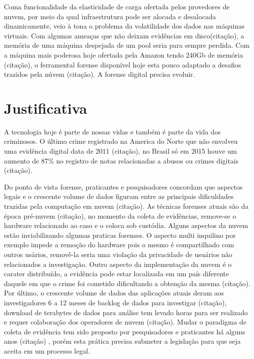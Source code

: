\documentclass[
	12pt,				%
	openright,			%
	oneside,			%
	a4paper,			%
	english,			%
	french,				%
	spanish,			%
	brazil,				%
	]{abntex2}
\begin{document}
\par

Coma funcionalidade da elasticidade de carga ofertada pelos provedores de nuvem, por meio da qual infraestrutura pode ser alocada e desalocada dinamicamente, veio à tona o problema
da volatilidade dos dados nas máquinas virtuais. Com algumas ameaças que não deixam evidências em disco(citação), a memória de uma máquina despejada de um pool seria para sempre
perdida. Com a máquina mais poderosa hoje ofertada pela Amazon tendo 240Gb de memória (citação), o ferramental forense disponível hoje esta pouco adaptado a desafios trazidos 
pela núvem (citação). A forense digital precisa evoluir.

\chapter{Justificativa}

A tecnologia hoje é parte de nossas vidas e também é parte da vida dos criminosos. O último crime registrado na America do Norte que não envolveu uma evidência digital data de 2011
(citação), no Brasil só em 2015 houve um aumento de 87\% no registro de notas relacionadas a abusos ou crimes digitais (citação).

\par

Do ponto de vista forense, praticantes e pesquisadores concordam que aspectos legais e o crescente volume de dados figuram entre as principais dificuldades trazidas pela computação 
em nuvem (citação). As técnicas forenses atuais são da época pré-nuvem (citação), no momento da coleta de evidências, remove-se o hardware relacionado ao caso e o coloca sob 
custódia. Alguns aspectos da nuvem estão inviabilizando algumas praticas forenses. O aspecto multi inquilino por exemplo impede a remoção do hardware pois o mesmo é compartilhado
com outros usários, removê-la seria uma violação da privacidade de usuários não relacionados a investigação. Outro aspecto da implementação da nuvem é o carater distribuído, 
a evidência pode estar localizada em um país diferente daquele em que o crime foi cometido dificultando a obtenção da mesma (citação). Por último, o crescente volume de dados 
das aplicações atuais deram aos investigadores 6 a 12 meses de backlog de dados para investigar (citação), download de terabytes de dados para análise tem levado horas para ser 
realizado e requer colaboração dos operadores de nuvem (citação). Mudar o paradigma de coleta de evidência tem sido proposto por pesquisadores e praticantes há alguns anos (citação)
, porém esta prática precisa submeter a legislação para que seja aceita em um processo legal.
\end{document}
